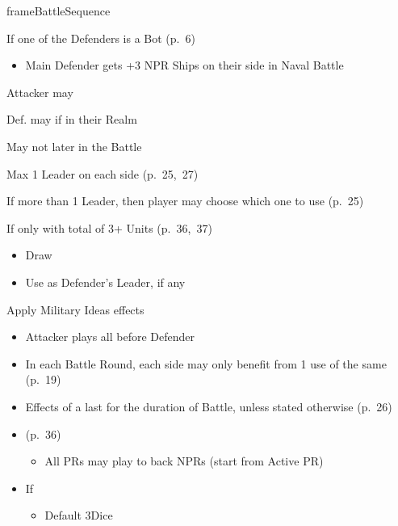 \documentclass[10pt]{article}
\newlength{\fhBattleSequence} \setlength\fhBattleSequence{50\baselineskip}
\begin{document}
\begin{dynamiccontents*}{frameBattleSequence}
\begin{eubox}{\fhBattleSequence}
\begin{multicols}{2}
\begin{itemize}
\begin{itemize}
\begin{itemize}
				\end{itemize}
				{\botrules
				\item If one of the Defenders is a Bot (p.~6)
				\begin{itemize}
					\item Main Defender gets +3 NPR Ships on their side in Naval Battle
				\end{itemize}
				}
			\end{itemize}
			\item Attacker may 
			\item Def. may  if in their Realm
			\item May not  later in the Battle
			\item Max 1 Leader on each side (p.~25,~27)
			\item If more than 1 Leader, then player may choose which one to use (p.~25)
			\item If only  with total of 3+ Units (p.~36,~37)
			\begin{itemize}
				\item Draw \milcard
				\item Use as Defender's Leader, if any
			\end{itemize}
			\item Apply Military Ideas effects
		\end{itemize}
		\begin{itemize}
			\item Attacker plays all \battleactions before Defender
			\item In each Battle Round, each side may only benefit from 1 use of the same \battleaction (p.~19)
			\item Effects of a \battleaction last for the duration of Battle, unless stated otherwise (p.~26)
			\item {} (p.~36)
			\begin{itemize}
				\item All PRs may play \battleactions to back NPRs (start from Active PR)
			\end{itemize}
		\end{itemize}
		\begin{itemize}
			\item If 
			\begin{itemize}
				\item Default 3\infantry Dice

\end{itemize}
\end{itemize}
\end{multicols}
\end{eubox}
\end{dynamiccontents*}
\end{document}
